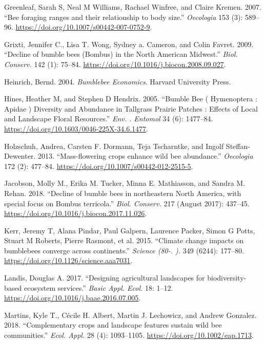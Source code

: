 \documentclass[11pt,]{article}
\begin{document}
\leavevmode\hypertarget{ref-Greenleaf2007b}{}%
Greenleaf, Sarah S, Neal M Williams, Rachael Winfree, and Claire Kremen.
2007. ``Bee foraging ranges and their relationship to body size.''
\emph{Oecologia} 153 (3): 589--96.
\url{https://doi.org/10.1007/s00442-007-0752-9}.

\leavevmode\hypertarget{ref-Grixti2009}{}%
Grixti, Jennifer C., Lisa T. Wong, Sydney a. Cameron, and Colin Favret.
2009. ``Decline of bumble bees (Bombus) in the North American Midwest.''
\emph{Biol. Conserv.} 142 (1): 75--84.
\url{https://doi.org/10.1016/j.biocon.2008.09.027}.

\leavevmode\hypertarget{ref-Heinrich2004}{}%
Heinrich, Bernd. 2004. \emph{Bumblebee Economics}. Harvard University
Press.

\leavevmode\hypertarget{ref-Hines2005}{}%
Hines, Heather M, and Stephen D Hendrix. 2005. ``Bumble Bee (
Hymenoptera : Apidae ) Diversity and Abundance in Tallgrass Prairie
Patches : Effects of Local and Landscape Floral Resources.'' \emph{Env.
. Entomol} 34 (6): 1477--84.
\url{https://doi.org/10.1603/0046-225X-34.6.1477}.

\leavevmode\hypertarget{ref-Holzschuh2013}{}%
Holzschuh, Andrea, Carsten F. Dormann, Teja Tscharntke, and Ingolf
Steffan-Dewenter. 2013. ``Mass-flowering crops enhance wild bee
abundance.'' \emph{Oecologia} 172 (2): 477--84.
\url{https://doi.org/10.1007/s00442-012-2515-5}.

\leavevmode\hypertarget{ref-Jacobson2018a}{}%
Jacobson, Molly M., Erika M. Tucker, Minna E. Mathiasson, and Sandra M.
Rehan. 2018. ``Decline of bumble bees in northeastern North America,
with special focus on Bombus terricola.'' \emph{Biol. Conserv.} 217
(August 2017): 437--45.
\url{https://doi.org/10.1016/j.biocon.2017.11.026}.

\leavevmode\hypertarget{ref-Kerr2015}{}%
Kerr, Jeremy T, Alana Pindar, Paul Galpern, Laurence Packer, Simon G
Potts, Stuart M Roberts, Pierre Rasmont, et al. 2015. ``Climate change
impacts on bumblebees converge across continents.'' \emph{Science (80-.
).} 349 (6244): 177--80. \url{https://doi.org/10.1126/science.aaa7031}.

\leavevmode\hypertarget{ref-Landis2017}{}%
Landis, Douglas A. 2017. ``Designing agricultural landscapes for
biodiversity-based ecosystem services.'' \emph{Basic Appl. Ecol.} 18:
1--12. \url{https://doi.org/10.1016/j.baae.2016.07.005}.

\leavevmode\hypertarget{ref-Martins2018}{}%
Martins, Kyle T., Cécile H. Albert, Martin J. Lechowicz, and Andrew
Gonzalez. 2018. ``Complementary crops and landscape features sustain
wild bee communities.'' \emph{Ecol. Appl.} 28 (4): 1093--1105.
\url{https://doi.org/10.1002/eap.1713}.
\end{document}
